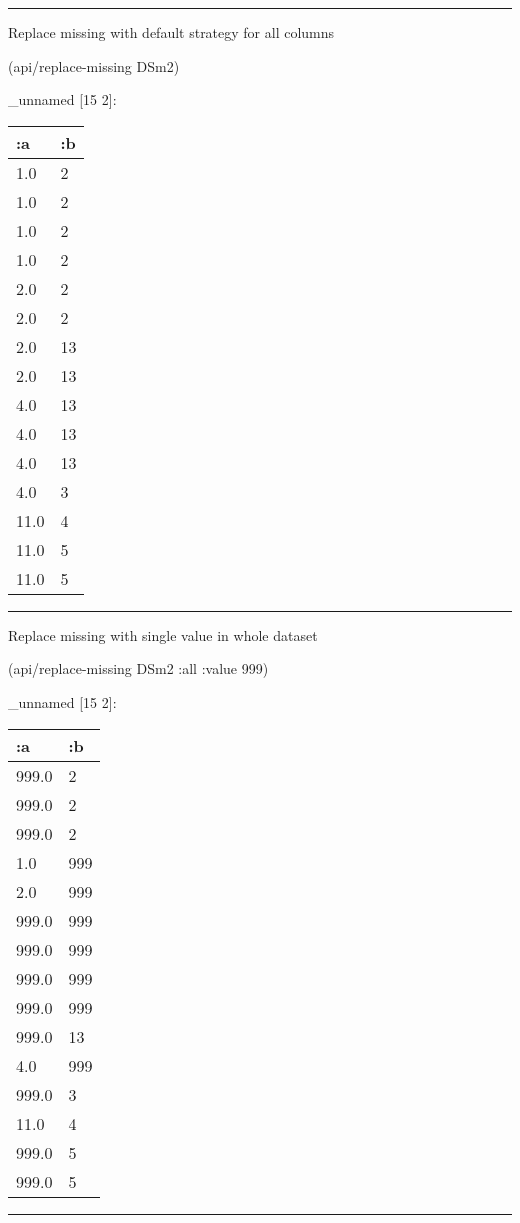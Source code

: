 \documentclass[]{article}
\newenvironment{Shaded}{\begin{snugshade}}{\end{snugshade}}
\newcommand{\AttributeTok}[1]{\textcolor[rgb]{0.77,0.63,0.00}{#1}}
\newcommand{\DecValTok}[1]{\textcolor[rgb]{0.00,0.00,0.81}{#1}}
\newcommand{\NormalTok}[1]{#1}
\begin{document}
\begin{center}\rule{0.5\linewidth}{0.5pt}\end{center}

Replace missing with default strategy for all columns

\begin{Shaded}
\begin{Highlighting}[]
\NormalTok{(api/replace-missing DSm2)}
\end{Highlighting}
\end{Shaded}

\_unnamed {[}15 2{]}:

\begin{longtable}[]{@{}ll@{}}
\toprule
:a & :b\tabularnewline
\midrule
\endhead
1.0 & 2\tabularnewline
1.0 & 2\tabularnewline
1.0 & 2\tabularnewline
1.0 & 2\tabularnewline
2.0 & 2\tabularnewline
2.0 & 2\tabularnewline
2.0 & 13\tabularnewline
2.0 & 13\tabularnewline
4.0 & 13\tabularnewline
4.0 & 13\tabularnewline
4.0 & 13\tabularnewline
4.0 & 3\tabularnewline
11.0 & 4\tabularnewline
11.0 & 5\tabularnewline
11.0 & 5\tabularnewline
\bottomrule
\end{longtable}

\begin{center}\rule{0.5\linewidth}{0.5pt}\end{center}

Replace missing with single value in whole dataset

\begin{Shaded}
\begin{Highlighting}[]
\NormalTok{(api/replace-missing DSm2 }\AttributeTok{:all} \AttributeTok{:value} \DecValTok{999}\NormalTok{)}
\end{Highlighting}
\end{Shaded}

\_unnamed {[}15 2{]}:

\begin{longtable}[]{@{}ll@{}}
\toprule
:a & :b\tabularnewline
\midrule
\endhead
999.0 & 2\tabularnewline
999.0 & 2\tabularnewline
999.0 & 2\tabularnewline
1.0 & 999\tabularnewline
2.0 & 999\tabularnewline
999.0 & 999\tabularnewline
999.0 & 999\tabularnewline
999.0 & 999\tabularnewline
999.0 & 999\tabularnewline
999.0 & 13\tabularnewline
4.0 & 999\tabularnewline
999.0 & 3\tabularnewline
11.0 & 4\tabularnewline
999.0 & 5\tabularnewline
999.0 & 5\tabularnewline
\bottomrule
\end{longtable}

\begin{center}\rule{0.5\linewidth}{0.5pt}\end{center}
\end{document}

